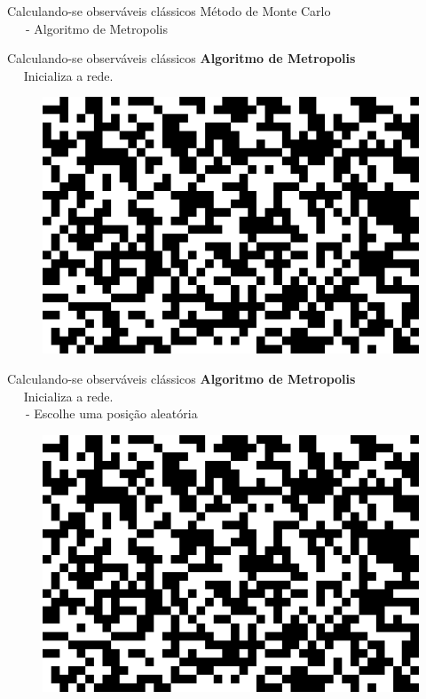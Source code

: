 \documentclass[10pt]{beamer}
\begin{document}
\begin{frame}{Calculando-se observáveis clássicos}
	Método de Monte Carlo \\
	
	\ \ \ - Algoritmo de Metropolis

\end{frame}

\begin{frame}{Calculando-se observáveis clássicos}
	\textbf{Algoritmo de Metropolis} \\
	
	\ \ \- Inicializa a rede. 
	\begin{figure}[h]
		\center
		\includegraphics[scale=.2]{initLattice.png}	
	\end{figure}

\end{frame}

\begin{frame}{Calculando-se observáveis clássicos}
	\textbf{Algoritmo de Metropolis} \\
	
	\ \ \- Inicializa a rede. \\
	\ \ \ - Escolhe uma posição aleatória
	\begin{figure}[h]
		\center
		\includegraphics[scale=.2]{initLattice.png}	
	\end{figure}

\end{frame}
\end{document}
